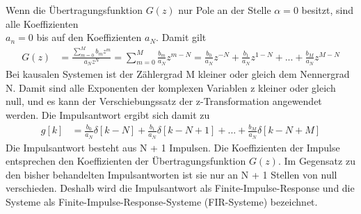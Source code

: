 Wenn die Übertragungsfunktion \(G(z)\) nur Pole an der Stelle \(α = 0\) besitzt, sind alle Koeffizienten\\
\(a_{n} = 0\) bis auf den Koeffizienten \(a_{N}\). Damit gilt
\begin{align}
G(z) &= \frac{\sum\limits_{m = 0}^{M}{b_{m}  z^{m}}}{a_{N}  z^{N}} = \sum\limits_{m = 0}^{M}{\frac{b_{m}}{a_{N}}  z^{m - N}} = \frac{b_{0}}{a_{N}}  z^{- N} + \frac{b_{1}}{a_{N}}  z^{1 - N} + ... + \frac{b_{M}}{a_{N}}  z^{M - N} \label{eq:6.108}
\end{align}
Bei kausalen Systemen ist der Zählergrad M kleiner oder gleich dem Nennergrad N. Damit sind alle Exponenten der komplexen Variablen z kleiner oder gleich null, und es kann der Verschiebungssatz der z-Transformation angewendet werden. Die Impulsantwort ergibt sich damit zu
\begin{align}
g[ k] &= \frac{b_{0}}{a_{N}}  \delta[ k - N] + \frac{b_{1}}{a_{N}}  \delta[ k - N + 1] + ... + \frac{b_{M}}{a_{N}}  \delta[ k - N + M] \label{eq:6.109}
\end{align}
Die Impulsantwort besteht aus N + 1 Impulsen. Die Koeffizienten der Impulse entsprechen den Koeffizienten der Übertragungsfunktion \(G(z)\). Im Gegensatz zu den bisher behandelten Impulsantworten ist sie nur an N + 1 Stellen von null verschieden. Deshalb wird die Impulsantwort als Finite-Impulse-Response und die Systeme als Finite-Impulse-Response-Systeme (FIR-Systeme) bezeichnet.

